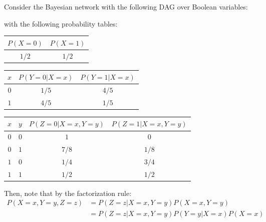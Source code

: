\documentclass{article}
\begin{document}
\clearpage
\problem{}
Consider the Bayesian network with the following DAG over Boolean variables:
\begin{center}
\end{center}
with the following probability tables:
\begin{center}
\begin{tabular}{|c|c|}
    \hline
    $P(X = 0)$ & $P(X = 1)$ \\
    \hline
    $1/2$ & $1/2$ \\
    \hline
\end{tabular}
\end{center}
\begin{center}
\begin{tabular}{|c|c|c|}
    \hline
    $x$ & $P(Y = 0 | X = x)$ & $P(Y = 1 | X = x)$ \\
    \hline
    $0$ & $1/5$ & $4/5$ \\
    \hline
    $1$ & $4/5$ & $1/5$ \\
    \hline
\end{tabular}
\end{center}
\begin{center}
\begin{tabular}{|c|c|c|c|}
    \hline
    $x$ & $y$ & $P(Z = 0 | X = x, Y = y)$ & $P(Z = 1 | X = x, Y = y)$ \\
    \hline
    $0$ & $0$ & $1$ & $0$ \\
    \hline
    $0$ & $1$ & $7/8$ & $1/8$ \\
    \hline
    $1$ & $0$ & $1/4$ & $3/4$ \\
    \hline
    $1$ & $1$ & $1/2$ & $1/2$ \\
    \hline
\end{tabular}
\end{center}
Then, note that by the factorization rule:
\begin{align*}
    P(X = x, Y = y, Z = z) & = P(Z = z | X = x, Y = y)P(X = x, Y = y) \\
    & = P(Z = z | X = x, Y = y)P(Y = y | X = x)P(X = x)
\end{align*}
\end{document}
